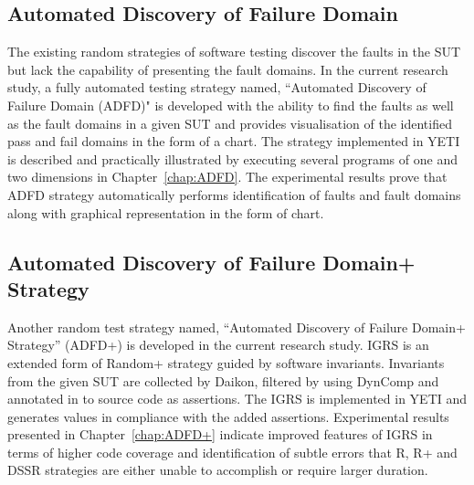 \subsection{Automated Discovery of Failure Domain}
The existing random strategies of software testing discover the faults in the SUT but lack the capability of presenting the fault domains. In the current research study, a fully automated testing strategy named, ``Automated Discovery of Failure Domain (ADFD)" is developed with the ability to find the faults as well as the fault domains in a given SUT and provides visualisation of the identified pass and fail domains in the form of a chart. The strategy implemented in YETI is described and practically illustrated by executing several programs of one and two dimensions in Chapter~\ref{chap:ADFD}. The experimental results prove that ADFD strategy automatically performs identification of faults and fault domains along with graphical representation in the form of chart.

\subsection{Automated Discovery of Failure Domain+ Strategy}
Another random test strategy named, ``Automated Discovery of Failure Domain+ Strategy'' (ADFD+) is developed in the current research study. IGRS is an extended form of Random+ strategy guided by software invariants. Invariants from the given SUT are collected by Daikon, filtered by using DynComp and annotated in to source code as assertions. The IGRS is implemented in YETI and generates values in compliance with the added assertions. Experimental results presented in Chapter~\ref{chap:ADFD+} indicate improved features of IGRS in terms of higher code coverage and identification of subtle errors that R, R+ and DSSR strategies are either unable to accomplish or require larger duration.  

%



